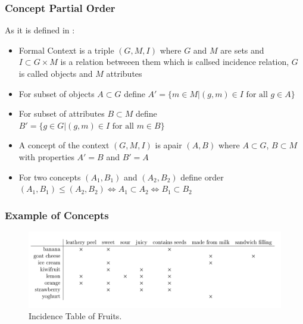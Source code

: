 \documentclass{beamer}
\begin{document}
\begin{frame}
    \frametitle{Concept Partial Order}
        As it is defined in \cite{FCATut}:
        \begin{itemize}
            \item Formal Context is a triple $(G, M, I)$ 
            where $G$ and $M$ are sets and $I \subset G \times M$ 
            is a relation betweeen them which is callsed incidence relation, 
            $G$ is called objects and $M$ attributes 
            \item For subset of objects $A \subset G$  define 
            $A' =\{ m\in M | (g, m) \in I \text{ for all }g \in A \}$
            \item For subset of attributes $B \subset M$ define
            $B' =\{ g\in G | (g, m) \in I \text{ for all } m \in B \}$
            \item A concept of the context $(G, M, I)$ is apair $(A, B)$ 
            where $A \subset G$, $B \subset M$ with properties $A' = B$ and $B' = A$
            \item For two concepts $(A_1,B_1)$ and $(A_2,B_2)$ define order 
            $(A_1,B_1) \le (A_2,B_2)  \iff A_1 \subset A_2  \iff B_1 \subset B_2$
        \end{itemize}
\end{frame}

\begin{frame}
    \frametitle{Example of Concepts}
    \begin{figure}
        \includegraphics[width=\linewidth]{concept_1.png}
        \caption{Incidence Table of Fruits.}
        \label{fig:fruits}
      \end{figure}
\end{frame}
\end{document}
